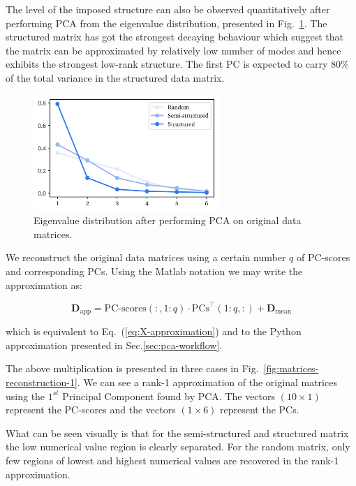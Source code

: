 \documentclass[10pt,twocolumn]{article}
\begin{document}
The level of the imposed structure can also be observed quantitatively after performing PCA from the eigenvalue distribution, presented in Fig.~\ref{fig:eigenvalues}. The structured matrix has got the strongest decaying behaviour which suggest that the matrix can be approximated by relatively low number of modes and hence exhibits the strongest low-rank structure. The first PC is expected to carry 80\% of the total variance in the structured data matrix.

\begin{figure}[H]
\centering\includegraphics[width=7cm]{matrix-reconstruction-eigenvalues-comparison.png}
\caption{Eigenvalue distribution after performing PCA on original data matrices.}			
\label{fig:eigenvalues}
\end{figure}

We reconstruct the original data matrices using a certain number $q$ of PC-scores and corresponding PCs. Using the Matlab notation we may write the approximation as:

\begin{equation} \label{eq:data-set-approximation}
\mathbf{D}_{\text{app}} = \text{PC-scores}(:,1:q) \cdot \text{PCs}^{\top}(1:q,:) + \mathbf{D}_{\text{mean}}
\end{equation}

which is equivalent to Eq.~(\ref{eq:X-approximation}) and to the Python approximation presented in Sec.\ref{sec:pca-workflow}.

The above multiplication is presented in three cases in Fig.~\ref{fig:matrices-reconstruction-1}. We can see a rank-1 approximation of the original matrices using the $1^{st}$ Principal Component found by PCA. The vectors $(10 \times 1)$ represent the PC-scores and the vectors $(1 \times 6)$ represent the PCs.

What can be seen visually is that for the semi-structured and structured matrix the low numerical value region is clearly separated. For the random matrix, only few regions of lowest and highest numerical values are recovered in the rank-1 approximation.
\end{document}
